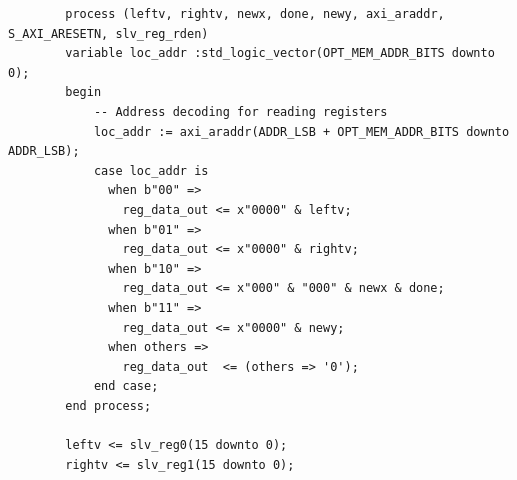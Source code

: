 \documentclass[11pt, a4paper]{report}
\begin{document}
\begin{verbatim}
		process (leftv, rightv, newx, done, newy, axi_araddr, S_AXI_ARESETN, slv_reg_rden)
		variable loc_addr :std_logic_vector(OPT_MEM_ADDR_BITS downto 0);
		begin
		    -- Address decoding for reading registers
		    loc_addr := axi_araddr(ADDR_LSB + OPT_MEM_ADDR_BITS downto ADDR_LSB);
		    case loc_addr is
		      when b"00" =>
		        reg_data_out <= x"0000" & leftv;
		      when b"01" =>
		        reg_data_out <= x"0000" & rightv;
		      when b"10" =>
		        reg_data_out <= x"000" & "000" & newx & done;
		      when b"11" =>
		        reg_data_out <= x"0000" & newy;
		      when others =>
		        reg_data_out  <= (others => '0');
		    end case;
		end process;
		
		leftv <= slv_reg0(15 downto 0);
  		rightv <= slv_reg1(15 downto 0);
\end{verbatim}
\end{document}
